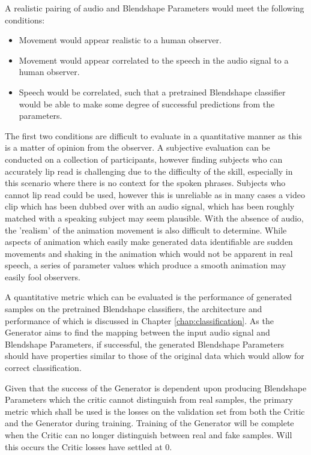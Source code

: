 A realistic pairing of audio and Blendshape Parameters would meet the following conditions:
\begin{itemize}
    \item Movement would appear realistic to a human observer.
    \item Movement would appear correlated to the speech in the audio signal to a human observer.
    \item Speech would be correlated, such that a pretrained Blendshape classifier would be able to make some degree of successful predictions from the parameters.
\end{itemize}

The first two conditions are difficult to evaluate in a quantitative manner as this is a matter of opinion from the observer.
A subjective evaluation can be conducted on a collection of participants, however finding subjects who can accurately lip read is challenging due to the difficulty of the skill, especially in this scenario where there is no context for the spoken phrases.
Subjects who cannot lip read could be used, however this is unreliable as in many cases a video clip which has been dubbed over with an audio signal, which has been roughly matched with a speaking subject may seem plausible.
With the absence of audio, the 'realism' of the animation movement is also difficult to determine.
While aspects of animation which easily make generated data identifiable are sudden movements and shaking in the animation which would not be apparent in real speech, a series of parameter values which produce a smooth animation may easily fool observers.

A quantitative metric which can be evaluated is the performance of generated samples on the pretrained Blendshape classifiers, the architecture and performance of which is discussed in Chapter \ref{chap:classification}.
As the Generator aims to find the mapping between the input audio signal and Blendshape Parameters, if successful, the generated Blendshape Parameters should have properties similar to those of the original data which would allow for correct classification.

Given that the success of the Generator is dependent upon producing Blendshape Parameters which the critic cannot distinguish from real samples, the primary metric which shall be used is the losses on the validation set from both the Critic and the Generator during training.
Training of the Generator will be complete when the Critic can no longer distinguish between real and fake samples.
Will this occurs the Critic losses have settled at 0.

